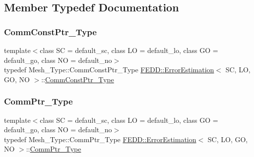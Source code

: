\subsection{Member Typedef Documentation}
\mbox{\label{classFEDD_1_1ErrorEstimation_a23c88f794d901561ef57840b68c0aa20}} 
\subsubsection{\texorpdfstring{Comm\+Const\+Ptr\+\_\+\+Type}{CommConstPtr\_Type}}
{\footnotesize\ttfamily template$<$class SC  = default\+\_\+sc, class LO  = default\+\_\+lo, class GO  = default\+\_\+go, class NO  = default\+\_\+no$>$ \\
typedef Mesh\+\_\+\+Type\+::\+Comm\+Const\+Ptr\+\_\+\+Type \hyperlink{classFEDD_1_1ErrorEstimation}{F\+E\+D\+D\+::\+Error\+Estimation}$<$ SC, LO, GO, NO $>$\+::\hyperlink{classFEDD_1_1ErrorEstimation_a23c88f794d901561ef57840b68c0aa20}{Comm\+Const\+Ptr\+\_\+\+Type}}

\mbox{\label{classFEDD_1_1ErrorEstimation_ac5689e70e0c965f5373f2a716c0250c1}} 
\subsubsection{\texorpdfstring{Comm\+Ptr\+\_\+\+Type}{CommPtr\_Type}}
{\footnotesize\ttfamily template$<$class SC  = default\+\_\+sc, class LO  = default\+\_\+lo, class GO  = default\+\_\+go, class NO  = default\+\_\+no$>$ \\
typedef Mesh\+\_\+\+Type\+::\+Comm\+Ptr\+\_\+\+Type \hyperlink{classFEDD_1_1ErrorEstimation}{F\+E\+D\+D\+::\+Error\+Estimation}$<$ SC, LO, GO, NO $>$\+::\hyperlink{classFEDD_1_1ErrorEstimation_ac5689e70e0c965f5373f2a716c0250c1}{Comm\+Ptr\+\_\+\+Type}}

\mbox{\label{classFEDD_1_1ErrorEstimation_a8014e1e4844351d77d667159034e7523}} 
